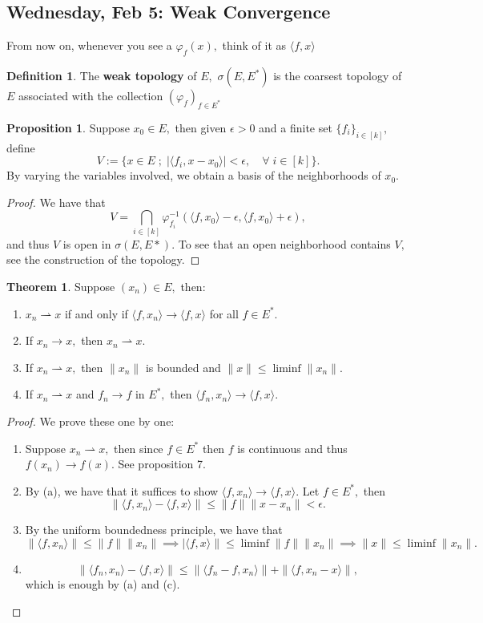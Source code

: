\documentclass[10pt, oneside]{article}
\theoremstyle{definition}
\newtheorem{thm}{Theorem}
\newtheorem{defn}{Definition}
\newtheorem{prop}{Proposition}
\begin{document}
\subsection{Wednesday, Feb 5: Weak Convergence}
From now on, whenever you see a $\varphi_f(x),$ think of it as $\langle f, x\rangle$
\begin{defn}
    The \textbf{weak topology} of $E,$ $\sigma(E, E^*)$ is the coarsest topology of $E$ associated with the collection $(\varphi_f)_{f\in E^*}$
\end{defn}
\begin{prop}
    Suppose $x_0 \in E,$ then given $\epsilon>0$ and a finite set $\{f_i\}_{i\in [k]},$ define
    \[V:= \{x \in E \; ; \; |\langle f_i, x-x_0\rangle| < \epsilon, \quad \forall \; i \in [k]\}.\] By varying the variables involved, we obtain a basis of the neighborhoods of $x_0.$
\end{prop}
\begin{proof}
    We have that 
    \[V = \bigcap_{i\in [k]}\varphi_{f_i}^{-1}(\langle f, x_0 \rangle - \epsilon, \langle f, x_0 \rangle + \epsilon),\] and thus $V$ is open in $\sigma(E, E*).$ To see that an open neighborhood contains $V,$ see the construction of the topology.
\end{proof}
\begin{thm}
    Suppose $(x_n) \in E,$ then:
    \begin{enumerate}
        \item $x_n\rightharpoonup x$  if and only if $\langle f, x_n\rangle \to \langle f, x\rangle$ for all $f\in E^*.$
        \item If $x_n \to x,$ then $x_n \rightharpoonup x.$
        \item If $x_n \rightharpoonup x,$ then $\|x_n\|$ is bounded and $\|x\|\leq \liminf \|x_n\|.$
        \item If $x_n \rightharpoonup x$ and $f_n \to f$ in $E^*,$ then $\langle f_n, x_n \rangle \to \langle f, x\rangle.$
    \end{enumerate}
\end{thm}
\begin{proof}
    We prove these one by one:
    \begin{enumerate}
        \item Suppose $x_n \rightharpoonup x,$ then since $f\in E^*$ then $f$ is continuous and thus $f(x_n) \to f(x).$ See proposition 7.
        \item By (a), we have that it suffices to show $\langle f, x_n\rangle \to \langle f, x\rangle.$ Let $f\in E^*,$ then 
        \[\|\langle f, x_n \rangle - \langle f, x\rangle\|\leq \|f\|\|x - x_n\| < \epsilon.\]
        \item By the uniform boundedness principle, we have that 
        \[\|\langle f, x_n\rangle\| \leq \|f\|\|x_n\| \implies |\langle f, x\rangle\| \leq \liminf \|f\|\|x_n\| \implies \|x\|\leq \liminf \|x_n\|.\]
        \item 
        \[\|\langle f_n, x_n \rangle- \langle f, x\rangle\| \leq \|\langle f_n - f, x_n \rangle\| + \|\langle f, x_n - x\rangle\|,\] which is enough by (a) and (c).
    \end{enumerate}
\end{proof}
\end{document}
